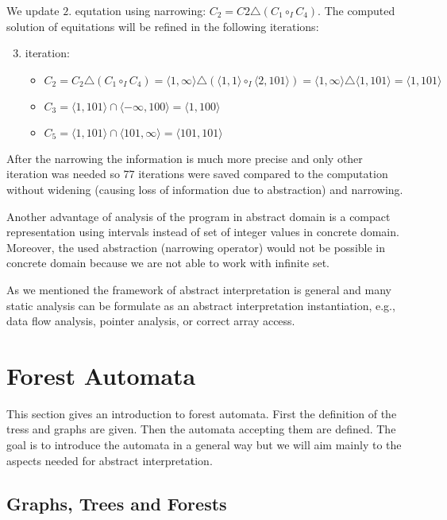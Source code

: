 \documentclass[a4paper, 12pt]{article}
\newcommand{\interval}[2]{\langle #1,#2 \rangle}
\newcommand{\ajoin}[0]{\circ}
\newcommand{\nar}[0]{\triangle}
\newcommand{\iintg}[0]{I}
\newcommand{\ijoin}[0]{\ajoin_\iintg}
\begin{document}
We update $2.$ equtation using narrowing:
$C_2 = C2 \nar (C_1 \ijoin C_4)$.
The computed solution of equitations will be refined in the following iterations:
\begin{enumerate}
	\setcounter{enumi}{2}
	\item \hspace{-0.5em} iteration:
		\begin{itemize}
			\item $C_2 = C_2 \nar (C_1 \ijoin C_4) = \interval{1}{\infty} \nar
				(\interval{1}{1} \ijoin \interval{2}{101}) = \interval{1}{\infty} \nar \interval{1}{101} = 
				\interval{1}{101}$
			\item $C_3 = \interval{1}{101} \cap \interval{-\infty}{100} = \interval{1}{100}$
			\item $C_5 = \interval{1}{101} \cap \interval{101}{\infty} = \interval{101}{101}$
		\end{itemize}
\end{enumerate}

After the narrowing the information is much more precise and only other iteration
was needed so $77$ iterations were saved compared to the computation without widening
(causing loss of information due to abstraction) and narrowing.

Another advantage of analysis of the program in abstract domain is a compact
representation using intervals instead of set of integer values in concrete domain.
Moreover, the used abstraction (narrowing operator) would not be possible in
concrete domain because we are not able to work with infinite set.

\eexmp

As we mentioned the framework of abstract interpretation is general and many static analysis
can be formulate as an abstract interpretation instantiation, e.g., data flow analysis,
pointer analysis, or correct array access.

\section{Forest Automata}
\label{sec:fa}

This section gives an introduction to forest automata.
First the definition of the tress and graphs are given.
Then the automata accepting them are defined.
The goal is to introduce the automata in a general way
but we will aim mainly to the aspects needed for abstract interpretation.

\subsection{Graphs, Trees and Forests}
\label{sec:graph}
\end{document}

